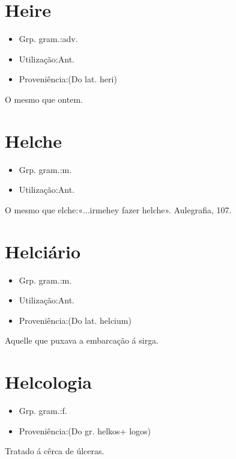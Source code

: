 \documentclass{article}
\begin{document}
\section{Heire}
\begin{itemize}
\item {Grp. gram.:adv.}
\end{itemize}
\begin{itemize}
\item {Utilização:Ant.}
\end{itemize}
\begin{itemize}
\item {Proveniência:(Do lat. \textunderscore heri\textunderscore )}
\end{itemize}
O mesmo que \textunderscore ontem\textunderscore .
\section{Helche}
\begin{itemize}
\item {Grp. gram.:m.}
\end{itemize}
\begin{itemize}
\item {Utilização:Ant.}
\end{itemize}
O mesmo que \textunderscore elche\textunderscore :«\textunderscore ...irmehey fazer helche\textunderscore ». \textunderscore Aulegrafia\textunderscore , 107.
\section{Helciário}
\begin{itemize}
\item {Grp. gram.:m.}
\end{itemize}
\begin{itemize}
\item {Utilização:Ant.}
\end{itemize}
\begin{itemize}
\item {Proveniência:(Do lat. \textunderscore helcium\textunderscore )}
\end{itemize}
Aquelle que puxava a embarcação á sirga.
\section{Helcologia}
\begin{itemize}
\item {Grp. gram.:f.}
\end{itemize}
\begin{itemize}
\item {Proveniência:(Do gr. \textunderscore helkos\textunderscore  + \textunderscore logos\textunderscore )}
\end{itemize}
Tratado á cêrca de úlceras.
\end{document}

